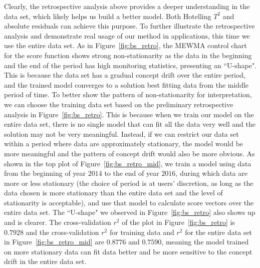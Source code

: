 \documentclass[twoside,11pt]{article}
\begin{document}
Clearly, the retrospective analysis above provides a deeper understanding in the data set, which likely helps us build a better model. Both Hotelling $T^2$ and absolute residuals can achieve this purpose. To further illustrate the retrospective analysis and demonstrate real usage of our method in applications, this time we use the entire data set. As in Figure~\ref{fig:bs_retro}, the MEWMA control chart for the score function shows strong non-stationarity as the data in the beginning and the end of the period has high monitoring statistics, presenting an ``U-shape". This is because the data set has a gradual concept drift over the entire period, and the trained model converges to a solution best fitting data from the middle period of time. To better show the pattern of non-stationarity for interpretation, we can choose the training data set based on the preliminary retrospective analysis in Figure~\ref{fig:bs_retro}. This is because when we train our model on the entire data set, there is no single model that can fit all the data very well and the solution may not be very meaningful. Instead, if we can restrict our data set within a period where data are approximately stationary, the model would be more meaningful and the pattern of concept drift would also be more obvious. As shown in the top plot of Figure~\ref{fig:bs_retro_mid}, we train a model using data from the beginning of year $2014$ to the end of year $2016$, during which data are more or less stationary (the choice of period is at users' discretion, as long as the data chosen is more stationary than the entire data set and the level of stationarity is acceptable), and use that model to calculate score vectors over the entire data set. The ``U-shape" we observed in Figure~\ref{fig:bs_retro} also shows up and is clearer. The cross-validation $r^2$ of the plot in Figure~\ref{fig:bs_retro} is $0.7928$ and the cross-validation $r^2$ for training data and $r^2$ for the entire data set in Figure~\ref{fig:bs_retro_mid} are $0.8776$ and $0.7590$, meaning the model trained on more stationary data can fit data better and be more sensitive to the concept drift in the entire data set. 
\end{document}
